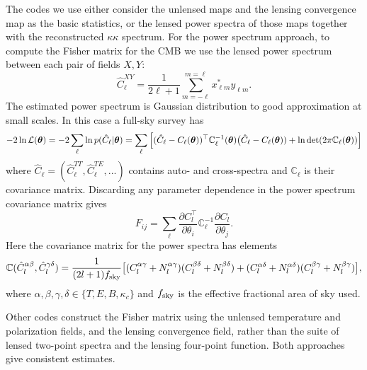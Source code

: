 The codes we use either consider the unlensed maps and the lensing convergence map as the basic statistics, or the lensed power spectra of those maps together with the reconstructed $\kappa \kappa$ spectrum. For the power spectrum approach, to compute the Fisher matrix for the CMB we use the lensed power spectrum between each pair of fields $X, Y$:
%
\begin{equation}
\label{eqEstimator}
\hat{C}^{XY}_\ell = \frac{1}{2\ell+1}\sum_{m=-\ell}^{m=\ell} x^{*}_{\ell m} y_{\ell m}.
\end{equation}
%
The estimated power spectrum is Gaussian distribution to good approximation at small scales. In this case a full-sky survey has
%
\begin{equation}
-2\ln\mathcal{L}(\boldsymbol{\theta}) = -2\sum_\ell \ln p( \hat{C}_\ell | \boldsymbol{\theta}) \\
=  \sum_\ell  \Big[ (\hat{C}_\ell - C_\ell(\boldsymbol{\theta}) )^\top  \mathbb{C}^{-1}_\ell(\boldsymbol{\theta}) \big(\hat{C}_\ell - C_\ell(\boldsymbol{\theta})) + \ln \det(2 \pi \mathbb{C}_\ell(\boldsymbol{\theta})) \Big]
\end{equation}
%
where $ \hat{C}_\ell = (\hat{C}_\ell^{TT}, \hat{C}_\ell^{TE}, ...) $ contains auto- and cross-spectra and $\mathbb{C}_\ell$ is their covariance matrix. Discarding any parameter dependence in the power spectrum covariance matrix gives
%
\begin{equation}
F_{ij} = \sum_\ell \frac{\partial C^\top_l}{\partial \theta_i} \mathbb{C}^{-1}_\ell \frac{\partial C_l}{\partial \theta_j}.
\end{equation}
%
Here the covariance matrix for the power spectra has elements
%
\begin{equation}
\mathbb{C}(\hat{C}_l^{\alpha \beta}, \hat{C}_l^{\gamma \delta}) = \frac{1}{(2l+1)f_{\rm sky}} \big[ (C_l^{\alpha \gamma} + N_l^{\alpha \gamma}) (C_l^{\beta \delta} + N_l^{\beta \delta})  \\
+ (C_l^{\alpha \delta} + N_l^{\alpha \delta}) (C_l^{\beta \gamma} + N_l^{\beta \gamma}) \big],
\end{equation}
%
where $\alpha, \beta, \gamma, \delta \in \{T, E, B, \kappa_c\}$ and $f_{\rm sky}$ is the effective fractional area of sky used. 

Other codes construct the Fisher matrix using the unlensed temperature and polarization fields, and the lensing convergence field, rather than the suite of lensed two-point spectra and the lensing four-point function. Both approaches give consistent estimates.

